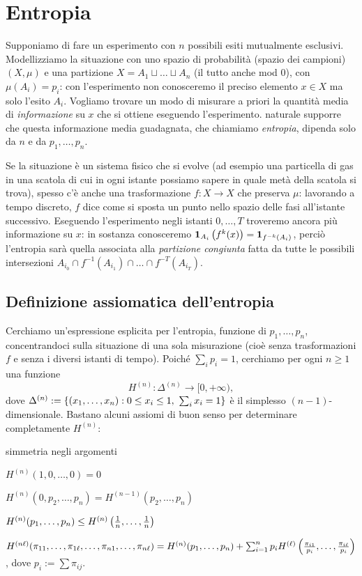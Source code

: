 \section{Entropia}

Supponiamo di fare un esperimento con $n$ possibili esiti mutualmente esclusivi.
Modellizziamo la situazione con uno spazio di probabilità (spazio dei campioni) $(X,\mu)$
e una partizione $X=A_1\sqcup \dots\sqcup A_n$ (il tutto anche mod $0$), con $\mu(A_i)=p_i$: con l'esperimento non conosceremo il preciso elemento $x\in X$ ma solo l'esito $A_i$. Vogliamo trovare un modo di misurare a priori la quantità media di \emph{informazione} su $x$ che si ottiene eseguendo l'esperimento. 
\Eacc naturale supporre che questa informazione media guadagnata, che chiamiamo \emph{entropia}, dipenda solo da $n$ e da $p_1,\dots,p_n$.

Se la situazione è un sistema fisico che si evolve (ad esempio una particella di gas in una scatola di cui
in ogni istante possiamo sapere in quale metà della scatola si trova), spesso c'è anche una trasformazione $f:X\to X$
che preserva $\mu$: lavorando a tempo discreto, $f$ dice come si sposta un punto nello spazio delle fasi
all'istante successivo. Eseguendo l'esperimento negli istanti $0,\dots,T$ troveremo ancora più informazione su $x$:
in sostanza conosceremo $\bm{1}_{A_i}\left(f^k(x)\right)=\bm{1}_{f^{-k}(A_i)}$, perciò l'entropia sarà quella associata
alla \emph{partizione congiunta} fatta da tutte le possibili intersezioni $A_{i_0}\cap f^{-1}(A_{i_1})\cap \dots\cap f^{-T}(A_{i_T})$.

\subsection{Definizione assiomatica dell'entropia}
Cerchiamo un'espressione esplicita per l'entropia, funzione di $p_1,\dots,p_n$, concentrandoci sulla situazione di una sola misurazione
(cioè senza trasformazioni $f$ e senza i diversi istanti di tempo).
Poiché $\sum_i p_i=1$, cerchiamo per ogni $n\ge 1$ una funzione 
\[H^{(n)}:\Delta^{(n)}\to [0,+\infty),\]
dove $\Delta^{(n)}:=\left\{(x_1,\dots,x_n):0\le x_i\le 1,\ \sum_i x_i=1\right\}$ è il simplesso $(n-1)$-dimensionale. Bastano alcuni assiomi di buon senso per determinare completamente $H^{(n)}$:
\begin{lista}
\item simmetria negli argomenti
\item $H^{(n)}(1,0,\dots,0)=0$
\item $H^{(n)}(0,p_2,\dots,p_n)=H^{(n-1)}(p_2,\dots,p_n)$
\item $H^{(n)}(p_1,\dots,p_n)\le H^{(n)}\left(\frac{1}{n},\dots,\frac{1}{n}\right)$
\item $H^{(n\ell)}(\pi_{11},\dots,\pi_{1\ell},\dots,\pi_{n1},\dots,\pi_{n\ell})=H^{(n)}(p_1,\dots,p_n)
+\sum_{i=1}^n p_i H^{(\ell)}\left(\frac{\pi_{i1}}{p_i},\dots,\frac{\pi_{i\ell}}{p_i}\right)$, dove $p_i:=\sum \pi_{ij}$.
\end{lista}

